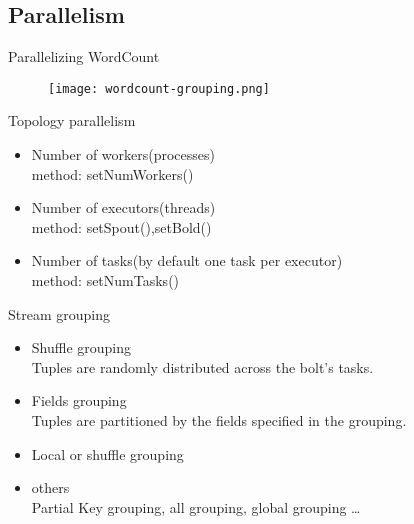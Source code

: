 \documentclass{beamer}
\begin{document}
\subsection{Parallelism}
\begin{frame}{Parallelizing WordCount}
  \begin{figure}
    \centering
    \texttt{[image: wordcount-grouping.png]}
  \end{figure}
\end{frame}
\begin{frame}{Topology parallelism}
  \begin{itemize}
    \item Number of workers(processes)\\
      method: setNumWorkers()
    \item Number of executors(threads)\\
      method: setSpout(),setBold()
    \item Number of tasks(by default one task per executor)\\
      method: setNumTasks()
  \end{itemize}
\end{frame}
\begin{frame}{Stream grouping}
  \begin{itemize}
    \item Shuffle grouping\\
      Tuples are randomly distributed across the bolt's tasks.
    \item Fields grouping\\
      Tuples are partitioned by the fields specified in the grouping.
    \item Local or shuffle grouping
    \item others\\
      Partial Key grouping, all grouping, global grouping \ldots
  \end{itemize}
\end{frame}
\end{document}
